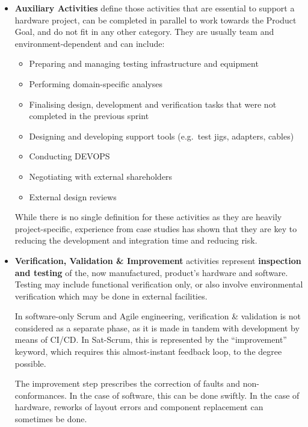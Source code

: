 \documentclass[a4paper,nobib,justified,final]{tufte-book}
\begin{document}
\begin{itemize}[itemsep=-1ex]
	\item \textbf{Auxiliary Activities} define those activities that are essential to support a hardware project, can be completed in parallel to work towards the Product Goal, and do not fit in any other category. They are usually team and environment-dependent and can include:
	\begin{itemize}[itemsep=-2ex]
		\item Preparing and managing testing infrastructure and equipment
		\item Performing domain-specific analyses
		\item Finalising design, development and verification tasks that were not completed in the previous sprint
		\item Designing and developing support tools (e.g.~test jigs, adapters, cables)
		\item Conducting \acf{DEVOPS}
		\item Negotiating with external shareholders
		\item External design reviews
	\end{itemize}
	
	While there is no single definition for these activities as they are heavily project-specific, experience from case studies has shown that they are key to reducing the development and integration time and reducing risk.
	\item \textbf{Verification, Validation \& Improvement} activities represent \textbf{inspection and testing} of the, now manufactured, product's hardware and software. Testing may include functional verification only, or also involve environmental verification which may be done in external facilities.
	
	In software-only Scrum and Agile engineering, verification \& validation is not considered as a separate phase, as it is made in tandem with development by means of \ac{CI}/\ac{CD}. In Sat-Scrum, this is represented by the ``improvement'' keyword, which requires this almost-instant feedback loop, to the degree possible.
	
	The improvement step prescribes the correction of faults and non-conformances. In the case of software, this can be done swiftly. In the case of hardware, reworks of layout errors and component replacement can sometimes be done.
	

\end{itemize}
\end{document}
